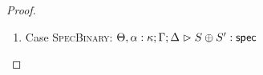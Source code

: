 \begin{proof}
\begin{enumerate}
  First, the syntax:
  \begin{tabbedproof}
    \oo By inversion, $\judgeS[\Theta, \alpha:\kappa, \beta:\kappa'; \Gamma; \Delta]{S}$ \\
    \oo By induction, $\judgeS[\Theta, \beta:\kappa'; {[\tau/\alpha]}\Gamma; {[\tau/\alpha]}\Delta]{{[\tau/\alpha]}S}$ \\
    \oo By rule, $\judgeS[\Theta; {[\tau/\alpha]}\Gamma; {[\tau/\alpha]}\Delta]
                         {Q \beta:\kappa'.\;{[\tau/\alpha]}S}$ \\
    \oo By def of subst, $\judgeS[\Theta; {[\tau/\alpha]}\Gamma; {[\tau/\alpha]}\Delta]
                                 {{[\tau/\alpha]}(Q \beta:\kappa'.\;S)}$ 
  \end{tabbedproof}

  For semantics, consider
  $\interp{\judgeS[\Theta; {[\tau/\alpha]}\Gamma; {[\tau/\alpha]}\Delta]
                  {{[\tau/\alpha]}(Q \beta:\kappa'.\;S)}}\;\theta\;\gamma\;\delta$ 
  \begin{eqnproof}
          {Semantics}
          {Induction}
          {Semantics}
  \end{eqnproof}

  The correctness of the application of $\gamma$ and $\delta$ follows from the equations for
  contexts under substitution. We also silently permute the context in the second line.

\item Case \textsc{SpecBinary}: $\judgeS[\Theta, \alpha:\kappa; \Gamma; \Delta]{S \oplus S'}$
  

\end{enumerate}
\end{proof}
